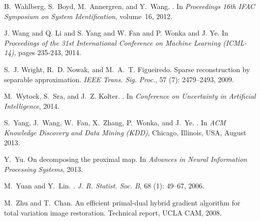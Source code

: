 \documentclass[twoside,11pt]{article}
\numberwithin{equation}{section}
\numberwithin{theorem}{section}
\begin{document}
\begin{thebibliography}{86}
B.~Wahlberg, S.~Boyd, M.~Annergren, and Y.~Wang.
.
\newblock In \emph{Proceedings 16th IFAC Symposium on System Identification},
  volume~16, 2012.

J. Wang and Q. Li and S. Yang and W. Fan and P. Wonka and J. Ye.
\newblock In \emph{Proceedings of the 31st International Conference on Machine Learning (ICML-14)}, pages 235-243, 2014.

S.~J. Wright, R.~D. Nowak, and M.~A.~T. Figueiredo.
\newblock Sparse reconstruction by separable approximation.
\newblock \emph{IEEE Trans. Sig. Proc.}, 57 (7): 2479--2493,
  2009.

M.~Wytock, S.~Sra, and J.~Z. Kolter.
.
\newblock In \emph{Conference on Uncertainty in Artificial Intelligence}, 2014.

S.~Yang, J.~Wang, W.~Fan, X.~Zhang, P.~Wonka, and J.~Ye.
.
\newblock In \emph{ACM Knowledge Discovery and Data Mining (KDD)}, Chicago,
  Illinois, USA, August 2013.

Y.~Yu.
\newblock On decomposing the proximal map.
\newblock In \emph{Advances in Neural Information Processing Systems}, 2013.

M.~Yuan and Y.~Lin.
.
\newblock \emph{J. R. Statist. Soc. B}, 68 (1): 49--67, 2006.

M.~Zhu and T.~Chan.
\newblock An efficient primal-dual hybrid gradient algorithm for total
  variation image restoration.
  \newblock Technical report, UCLA CAM, 2008.

\end{thebibliography}
\end{document}
